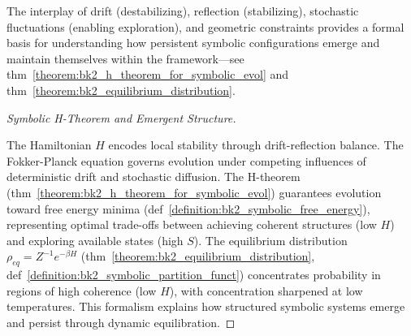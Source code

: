 \begin{theorem} 
\label{theorem:bk2_emergence_structure_symb_thermo} 
The interplay of drift (destabilizing), reflection (stabilizing), stochastic fluctuations (enabling exploration), and geometric constraints provides a formal basis for understanding how persistent symbolic configurations emerge and maintain themselves within the framework—see thm~\ref{theorem:bk2_h_theorem_for_symbolic_evol} and thm~\ref{theorem:bk2_equilibrium_distribution}.
\end{theorem}

\begin{proof}[Symbolic H-Theorem and Emergent Structure]
\label{proof:bk2_symbolic_h_theorem}
\leavevmode

The Hamiltonian $H$ encodes local stability through drift-reflection balance. The Fokker-Planck equation governs evolution under competing influences of deterministic drift and stochastic diffusion. The H-theorem (thm~\ref{theorem:bk2_h_theorem_for_symbolic_evol}) guarantees evolution toward free energy minima (def~\ref{definition:bk2_symbolic_free_energy}), representing optimal trade-offs between achieving coherent structures (low $H$) and exploring available states (high $S$). The equilibrium distribution $\rho_{eq} = Z^{-1}e^{-\beta H}$ (thm~\ref{theorem:bk2_equilibrium_distribution}, def~\ref{definition:bk2_symbolic_partition_funct}) concentrates probability in regions of high coherence (low $H$), with concentration sharpened at low temperatures. This formalism explains how structured symbolic systems emerge and persist through dynamic equilibration.
\end{proof}

